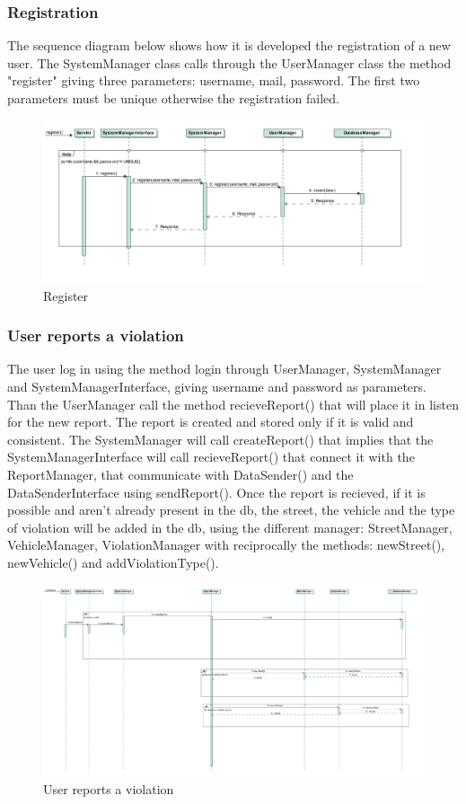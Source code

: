 \subsubsection{Registration}
The sequence diagram below shows how it is developed the registration of a new user. The SystemManager class calls through the UserManager class the method "register" giving three parameters: username, mail, password. The first two parameters must be unique otherwise the registration failed.

\begin{figure}[H]
	\centering
	\includegraphics[width=0.95\linewidth, height=0.37\textheight]{Images/RunTimeDiagram/Sequence1}
	\caption{Register}
	\label{fig:Register}
\end{figure}
\subsubsection{User reports a violation}
The user log in using the method login through UserManager, SystemManager and SystemManagerInterface, giving username and password as parameters.
Than the UserManager call the method recieveReport() that will place it in listen for the new report. The report is created and stored only if it is valid and consistent. The SystemManager will call createReport() that implies that the SystemManagerInterface will call recieveReport() that connect it with the ReportManager, that communicate with DataSender() and the DataSenderInterface using sendReport().
Once the report is recieved, if it is possible and aren't already present in the db, the street, the vehicle and the type of violation will be added in the db, using the different manager: StreetManager, VehicleManager, ViolationManager with reciprocally the methods: newStreet(), newVehicle() and addViolationType().
\begin{figure}[H] 
	\centering
	\includegraphics[width=0.95\linewidth, height=0.7\textheight]{Images/RunTimeDiagram/Sequence2}
	\caption{User reports a violation}
	\label{fig:User reports a violation}
\end{figure}
